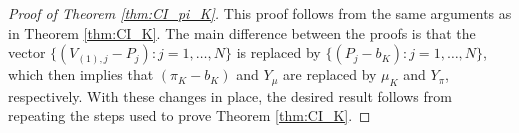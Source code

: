\begin{proof}[Proof of Theorem \ref{thm:CI_pi_K}]
This proof follows from the same arguments as in Theorem \ref{thm:CI_K}. The main difference between the proofs is that the vector $\{ (V_{(1),j}-P_{j}):j=1,\ldots ,N\} $ 
is replaced by $\{ (P_{j}-b_{K}):j=1,\ldots ,N\} $,
which then implies that $( \pi _{K}-b_{K}) $ and $Y_{\mu }$ are replaced by $\mu _{K}$ and $Y_{\pi }$, respectively. With these changes in place, the desired result follows from repeating the steps used to prove Theorem \ref{thm:CI_K}.

\end{proof}

